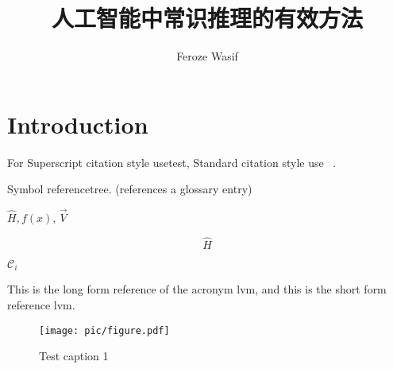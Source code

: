 \documentclass[doctor,english]{thesis-uestc}  %
\title{人工智能中常识推理的有效方法}{Efficient Methods for Commonsense Reasoning in Artificial Intelligence}
\author{Feroze Wasif}{Feroze Wasif} %
\begin{document}
\makecover %
\originalitydeclaration %
\begin{chineseabstract}

\end{chineseabstract}
\begin{englishabstract}

\end{englishabstract}

\thesistableofcontents %
\thesisfigurelist %
\thesistablelist %
\thesisglossarylist %
\thesissymbollist %

\chapter{Introduction}

For Superscript citation style usetest, Standard citation style use ~\cite{clerc2010discrete}.

Symbol reference\gls{tree}\cite{liuxf2006}. (references a glossary entry)

$\hat{H}, f(x)$, $\vec{V}$

$$\hat{H}$$

$\mathcal{C}_i$

This is the long form reference of the acronym \acrlong{lvm}, and this is the short form reference \acrshort{lvm}.

\begin{figure}[!htb]
    \texttt{[image: pic/figure.pdf]}
    \caption[short catption 1]{Test caption 1}
\end{figure}
\end{document}
